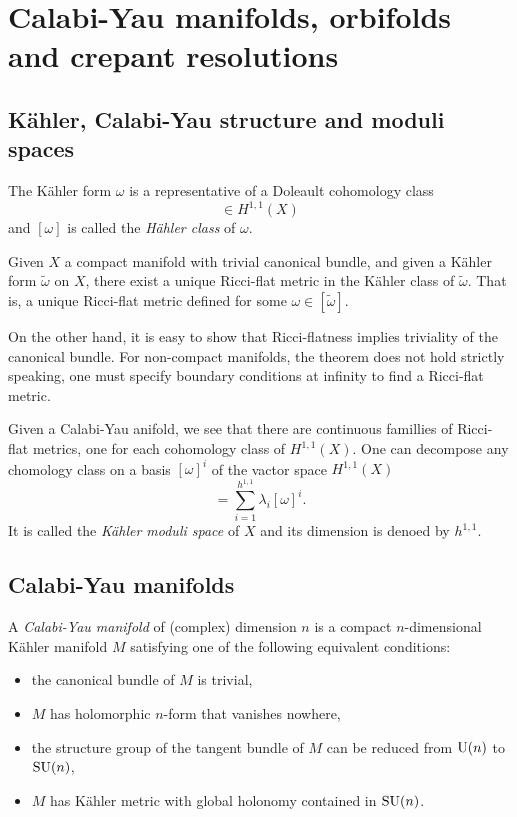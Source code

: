 
\section{Calabi-Yau manifolds, orbifolds and crepant resolutions}\label{sec:CY}

    \subsection{Kähler, Calabi-Yau structure and moduli spaces}

        The Kähler form $\omega$ is a representative of a Doleault cohomology class
        \begin{equation}
            [\omega]\in H^{1,1}(X)
        \end{equation}
        and $[\omega]$ is called the \emph{Hähler class} of $\omega$.
        \begin{theorem}
            Given $X$ a compact manifold with trivial canonical bundle, and given a Kähler form $\tilde{\omega}$ on $X$, there exist a unique Ricci-flat metric in the Kähler class of $\tilde{\omega}$. That is, a unique Ricci-flat metric defined for some $\omega\in[\tilde{\omega}]$.
        \end{theorem}
        On the other hand, it is easy to show that Ricci-flatness implies triviality of the canonical bundle. For non-compact manifolds, the theorem does not hold strictly speaking, one must specify boundary conditions at infinity to find a Ricci-flat metric.

        Given a Calabi-Yau anifold, we see that there are continuous famillies of Ricci-flat metrics, one for each cohomology class of $H^{1,1}(X)$. One can decompose any chomology class on a basis $[\omega]^i$ of the vactor space $H^{1,1}(X)$
        \begin{equation}
            [\omega]=\sum^{h^{1,1}}_{i=1}\lambda_i[\omega]^i.
        \end{equation}
        It is called the \emph{Kähler moduli space} of $X$ and its dimension is denoed by $h^{1,1}$.

    \subsection{Calabi-Yau manifolds}

        A \emph{Calabi-Yau manifold} of (complex) dimension $n$ is a compact $n$-dimensional Kähler manifold $M$ satisfying one of the following equivalent conditions:
        \begin{itemize}
            \item the canonical bundle of $M$ is trivial,
            \item $M$ has holomorphic $n$-form that vanishes nowhere,
            \item the structure group of the tangent bundle of $M$ can be reduced from $\text{U}(n)$ to $\text{SU}(n)$,
            \item $M$ has Kähler metric with global holonomy contained in $\text{SU}(n)$.
        \end{itemize}

